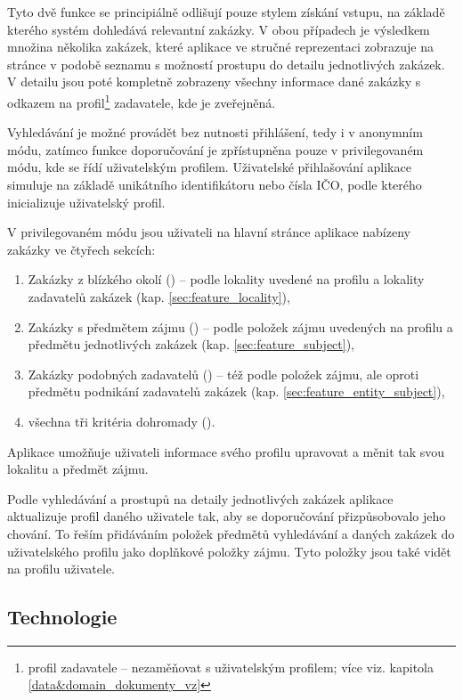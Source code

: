 \documentclass[thesis=M,czech]{FITthesis}[2019/12/23]
\begin{document}
Tyto dvě funkce se principiálně odlišují pouze stylem získání vstupu, na základě kterého systém dohledává relevantní zakázky. V obou případech je výsledkem množina několika zakázek, které aplikace ve stručné reprezentaci zobrazuje na stránce v podobě seznamu s možností prostupu do detailu jednotlivých zakázek. V detailu jsou poté kompletně zobrazeny všechny informace dané zakázky s odkazem na profil\footnote{profil zadavatele -- nezaměňovat s uživatelským profilem; více viz. kapitola \ref{data&domain_dokumenty_vz}} zadavatele, kde je zveřejněná.

Vyhledávání je možné provádět bez nutnosti přihlášení, tedy i v anonymním módu, zatímco funkce doporučování je zpřístupněna pouze v privilegovaném módu, kde se řídí uživatelským profilem. Uživatelské přihlašování aplikace simuluje na základě unikátního identifikátoru nebo čísla IČO, podle kterého inicializuje uživatelský profil.

V privilegovaném módu jsou uživateli na hlavní stránce aplikace nabízeny zakázky ve čtyřech sekcích:
\begin{enumerate}
    \item Zakázky z blízkého okolí () -- podle lokality uvedené na profilu a lokality zadavatelů zakázek (kap. \ref{sec:feature_locality}),
    \item Zakázky s předmětem zájmu () -- podle položek zájmu uvedených na profilu a předmětu jednotlivých zakázek (kap. \ref{sec:feature_subject}),
    \item Zakázky podobných zadavatelů () -- též podle položek zájmu, ale oproti předmětu podnikání zadavatelů zakázek (kap. \ref{sec:feature_entity_subject}),
    \item všechna tři kritéria dohromady ().
\end{enumerate}

Aplikace umožňuje uživateli informace svého profilu upravovat a měnit tak svou lokalitu a předmět zájmu.

Podle vyhledávání a prostupů na detaily jednotlivých zakázek aplikace aktualizuje profil daného uživatele tak, aby se doporučování přizpůsobovalo jeho chování. To řeším přidáváním položek předmětů vyhledávání a daných zakázek do uživatelského profilu jako doplňkové položky zájmu. Tyto položky jsou také vidět na profilu uživatele.

\subsection{Technologie}
\end{document}
